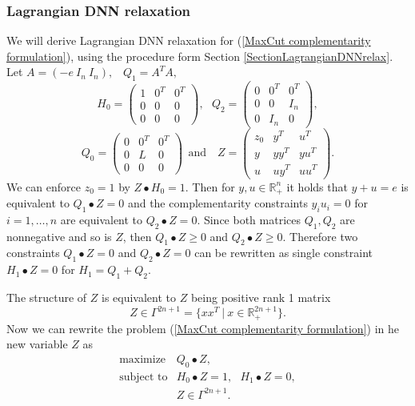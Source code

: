 \documentclass[12pt]{book}
\theoremstyle{definition}
\begin{document}
\subsubsection{Lagrangian DNN relaxation}
We will derive Lagrangian DNN relaxation for (\ref{MaxCut complementarity formulation}), using the procedure form Section \ref{SectionLagrangianDNNrelax}.  
Let $A = (-e \ I_n \ I_n),$ \ $Q_1 = A^TA,$ 
$$ 
H_0 = \left(\begin{array}{lll}
1 & 0^T & 0^T \\
0 & 0	& 0 \\
0 & 0	& 0
\end{array}\right), \ \ \
Q_2 = \left(\begin{array}{lll}
0 & 0^T & 0^T \\
0 & 0	& I_n \\
0 & I_n	& 0
\end{array}\right), 
$$ 
$$
Q_0 = \left(\begin{array}{lll}
0 & 0^T  & 0^T \\
0 & L & 0\\
0 & 0 & 0
\end{array}\right)
\ \ \mbox{and } \ \ \ Z = \left(\begin{array}{lll}
z_0 & y^T  & u^T \\
y & yy^T & yu^T \\
u & uy^T & uu^T
\end{array}\right). 
$$
We can enforce $z_0 = 1$ by $Z\bullet H_0 = 1$. Then for $y,u\in \mathbb{R}^n_+$ it holds that 
$y+u = e$ is equivalent to $Q_1\bullet Z = 0$ and 
the complementarity constraints $y_iu_i = 0$ for $i = 1,\dots ,n$ are equivalent to $Q_2\bullet Z = 0$. Since both matrices $Q_1,Q_2$ are nonnegative and so is $Z$, then $Q_1\bullet Z\geq 0$ and $Q_2\bullet Z\geq 0$. Therefore two constraints $Q_1\bullet Z=0$ and $Q_2\bullet Z=0$ can be rewritten as single constraint $H_1\bullet Z = 0$ for $H_1 = Q_1 + Q_2$. 

The structure of $Z$ is equivalent to $Z$ being positive rank 1 matrix
$$Z\in\Gamma^{2n+1} = \{ xx^T \ \vert \ x\in\mathbb{R}^{2n+1}_+\}. $$ 
Now we can rewrite the problem (\ref{MaxCut complementarity formulation}) in he new variable $Z$ as 	
\begin{equation*}
\begin{array}{ll}
\mbox{maximize} &  Q_0\bullet Z, \\
\mbox{subject to} & H_0 \bullet Z = 1, \ \ \ H_1\bullet Z = 0, \\
				& Z \in \Gamma^{2n+1}.
\end{array}	
\end{equation*}
\end{document}
